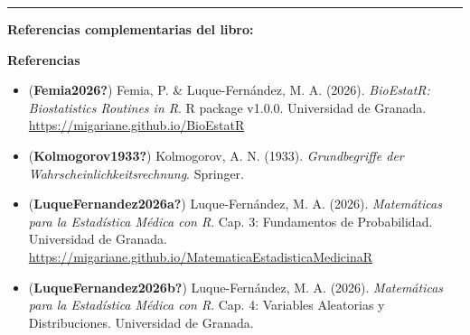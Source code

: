 \documentclass[
  letterpaper,
  DIV=11,
  numbers=noendperiod]{scrartcl}
\providecommand{\tightlist}{%
  \setlength{\itemsep}{0pt}\setlength{\parskip}{0pt}}
\begin{document}
\begin{center}\rule{0.5\linewidth}{0.5pt}\end{center}

\textbf{Referencias complementarias del libro:}

\textbf{Referencias}

\begin{itemize}
\tightlist
\item
  (\textbf{Femia2026?}) Femia, P. \& Luque-Fernández, M. A. (2026).
  \emph{BioEstatR: Biostatistics Routines in R}. R package v1.0.0.
  Universidad de Granada. \url{https://migariane.github.io/BioEstatR}
\item
  (\textbf{Kolmogorov1933?}) Kolmogorov, A. N. (1933).
  \emph{Grundbegriffe der Wahrscheinlichkeitsrechnung}. Springer.
\item
  (\textbf{LuqueFernandez2026a?}) Luque-Fernández, M. A. (2026).
  \emph{Matemáticas para la Estadística Médica con R}. Cap. 3:
  Fundamentos de Probabilidad. Universidad de Granada.
  \url{https://migariane.github.io/MatematicaEstadisticaMedicinaR}
\item
  (\textbf{LuqueFernandez2026b?}) Luque-Fernández, M. A. (2026).
  \emph{Matemáticas para la Estadística Médica con R}. Cap. 4: Variables
  Aleatorias y Distribuciones. Universidad de Granada.
\end{itemize}
\end{document}
